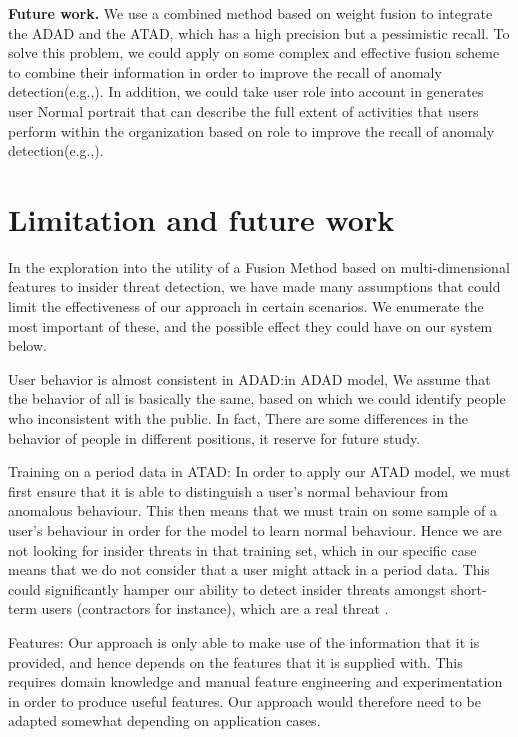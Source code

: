 \documentclass[conference]{IEEEtran}
\begin{document}
\textbf{Future work.}
We use a combined method based on weight fusion to integrate the ADAD and the ATAD, which has a high precision but a pessimistic recall. To solve this problem, we could apply on some complex and effective fusion scheme to combine their information in order to improve the recall of anomaly detection(e.g.,\cite{b49}).  In addition, we could take user role into account in generates user Normal portrait that can describe the full extent of activities that users perform within the organization based on role to improve the recall of anomaly detection(e.g.,\cite{b50}).   	

\iffalse
\section{Limitation and future work}

In the exploration into the utility of a Fusion Method based on multi-dimensional features to insider threat detection, we have made many assumptions that could limit the effectiveness of our approach in certain scenarios. We enumerate the most important of these, and the possible effect they could have on our system below.

User behavior is almost consistent in ADAD:in ADAD model, We assume that the behavior of all is basically the same, based on which we could identify people who inconsistent with the public. In fact, There are some differences in the behavior of people in different positions, it reserve for future study.

Training on a period data in ATAD: 
In order to apply our ATAD model, we must first ensure that it is able to distinguish a user’s normal behaviour from anomalous behaviour. This then means that we must train on some sample of a user’s behaviour in order for the model to learn normal behaviour. Hence we are not looking for insider threats in that training set, which in our specific case means that we do not consider that a user might attack in a period data. This could significantly hamper our ability to detect insider threats amongst short-term users (contractors for instance), which are a real threat \cite{b48}.

Features: Our approach is only able to make use of the information that it is provided, and hence depends on the features that it is supplied with. This requires domain knowledge and manual feature engineering and experimentation in order to produce useful features. Our approach would therefore need to be adapted somewhat depending on application cases.
\end{document}
